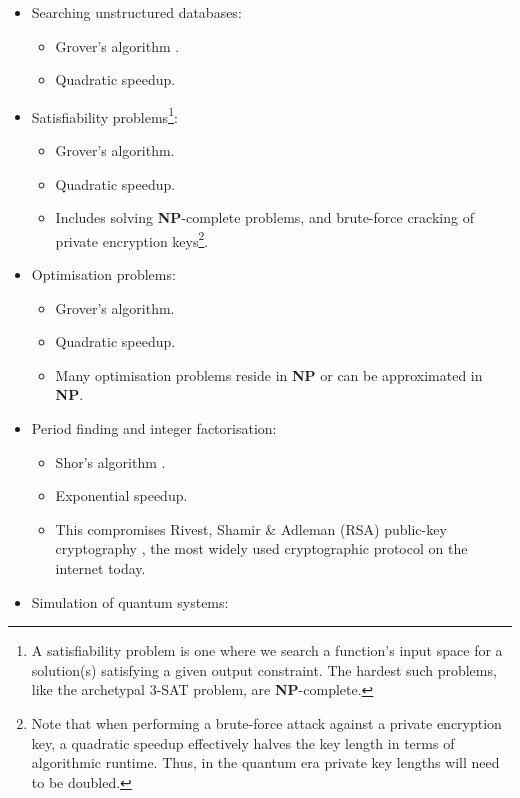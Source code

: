 \documentclass[aps, rmp, twocolumn, amsmath, amssymb, nofootinbib, superscriptaddress, longbibliography, floatfix, table-of-contents, eqsecnum]{revtex4-1}
\begin{document}
\begin{itemize}
	\item Searching unstructured databases:
		\begin{itemize}
		\item Grover's algorithm \cite{bib:Grover96}.
		\item Quadratic speedup.
		\end{itemize}
	\item Satisfiability problems\footnote{A satisfiability problem is one where we search a function's input space for a solution(s) satisfying a given output constraint. The hardest such problems, like the archetypal \textsc{3-SAT} problem, are \textbf{NP}-complete.}:
		\begin{itemize}
			\item Grover's algorithm.
			\item Quadratic speedup.
			\item Includes solving \textbf{NP}-complete problems, and brute-force cracking of private encryption keys\footnote{Note that when performing a brute-force attack against a private encryption key, a quadratic speedup effectively halves the key length in terms of algorithmic runtime. Thus, in the quantum era private key lengths will need to be doubled.}.
			\end{itemize}
	\item Optimisation problems:
		\begin{itemize}
			\item Grover's algorithm.
			\item Quadratic speedup.
			\item Many optimisation problems reside in \textbf{NP} or can be approximated in \textbf{NP}.
			\end{itemize}
	\item Period finding and integer factorisation:
		\begin{itemize}
		\item Shor's algorithm \cite{bib:ShorFactor}.
		\item Exponential speedup.
		\item This compromises Rivest, Shamir \& Adleman (RSA) public-key cryptography \cite{bib:RSA}, the most widely used cryptographic protocol on the internet today.
		\end{itemize}
	\item Simulation of quantum systems:

\end{itemize}
\end{document}
